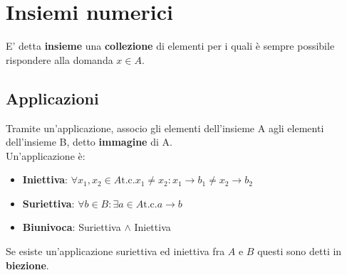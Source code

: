 \section{Insiemi numerici}
    E' detta \textbf{insieme} una \textbf{collezione} di elementi per i quali è 
    sempre possibile rispondere alla domanda $x \in A$.
    \subsection{Applicazioni}
    Tramite un'applicazione, associo gli elementi dell'insieme A
    agli elementi dell'insieme B, detto \textbf{immagine} di A. \\
    Un'applicazione è:
    \begin{itemize}
        \item \textbf{Iniettiva}: $
            \forall x_1, x_2 \in A \textrm{t.c.} x_1 \neq x_2:
            x_1 \rightarrow b_1 \neq x_2 \rightarrow b_2
        $
        \item \textbf{Suriettiva}: $\forall b \in B: 
            \exists a \in A \textrm{t.c.} a \rightarrow b
        $
        \item \textbf{Biunivoca}: Suriettiva $\wedge$ Iniettiva
    \end{itemize}
    Se esiste un'applicazione suriettiva ed iniettiva fra $A$ e $B$ questi sono
    detti in \textbf{biezione}.
